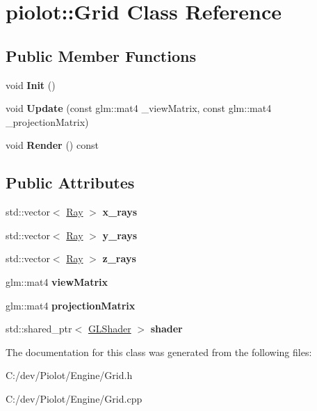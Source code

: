 \hypertarget{classpiolot_1_1_grid}{}\section{piolot\+:\+:Grid Class Reference}
\label{classpiolot_1_1_grid}
\subsection*{Public Member Functions}
\begin{DoxyCompactItemize}
\item 
\mbox{\label{classpiolot_1_1_grid_acde85bc00911a143d9407a814e1d6d88}} 
void {\bfseries Init} ()
\item 
\mbox{\label{classpiolot_1_1_grid_a3af0ba487e81a5d616788cd5f4ecbd11}} 
void {\bfseries Update} (const glm\+::mat4 \+\_\+view\+Matrix, const glm\+::mat4 \+\_\+projection\+Matrix)
\item 
\mbox{\label{classpiolot_1_1_grid_a36c9dfed35987b298ca3bf4ff3cb06a8}} 
void {\bfseries Render} () const
\end{DoxyCompactItemize}
\subsection*{Public Attributes}
\begin{DoxyCompactItemize}
\item 
\mbox{\label{classpiolot_1_1_grid_a09e5317cee1cd166c91363d608bde97d}} 
std\+::vector$<$ \mbox{\hyperlink{classpiolot_1_1_ray}{Ray}} $>$ {\bfseries x\+\_\+rays}
\item 
\mbox{\label{classpiolot_1_1_grid_a8eaf3716e1f5623d15fa26cf1e8b2778}} 
std\+::vector$<$ \mbox{\hyperlink{classpiolot_1_1_ray}{Ray}} $>$ {\bfseries y\+\_\+rays}
\item 
\mbox{\label{classpiolot_1_1_grid_a9407fb2aa26aae50604cd8d8197d3fb6}} 
std\+::vector$<$ \mbox{\hyperlink{classpiolot_1_1_ray}{Ray}} $>$ {\bfseries z\+\_\+rays}
\item 
\mbox{\label{classpiolot_1_1_grid_acc61d6d0bc8d0b7cf77da8193f40433e}} 
glm\+::mat4 {\bfseries view\+Matrix}
\item 
\mbox{\label{classpiolot_1_1_grid_ada577e74647a548fb07af5bd8597d6d8}} 
glm\+::mat4 {\bfseries projection\+Matrix}
\item 
\mbox{\label{classpiolot_1_1_grid_a3eaeeee54a7aef5807b8927b1ca2615e}} 
std\+::shared\+\_\+ptr$<$ \mbox{\hyperlink{classpiolot_1_1_g_l_shader}{G\+L\+Shader}} $>$ {\bfseries shader}
\end{DoxyCompactItemize}


The documentation for this class was generated from the following files\+:\begin{DoxyCompactItemize}
\item 
C\+:/dev/\+Piolot/\+Engine/Grid.\+h\item 
C\+:/dev/\+Piolot/\+Engine/Grid.\+cpp\end{DoxyCompactItemize}
